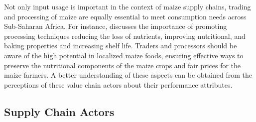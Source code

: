 \documentclass[12pt,english]{article}\usepackage[]{graphicx}\usepackage[]{color}
\begin{document}
Not only input usage is important in the context of maize supply chains,
trading and processing of maize are equally essential to meet consumption
needs across Sub-Saharan Africa. For instance, \citet{Ekpa2019} discusses
the importance of promoting processing techniques reducing the loss
of nutrients, improving nutritional, and baking properties and increasing
shelf life. Traders and processors should be aware of the high potential
in localized maize foods, ensuring effective ways to preserve the
nutritional components of the maize crops and fair prices for the
maize farmers. A better understanding of these aspects can be obtained
from the perceptions of these value chain actors about their performance
attributes. 
\begin{onehalfspace}

\subsection{Supply Chain Actors\label{subsec:Supply-Chain-Actors} }
\end{onehalfspace}
\end{document}
